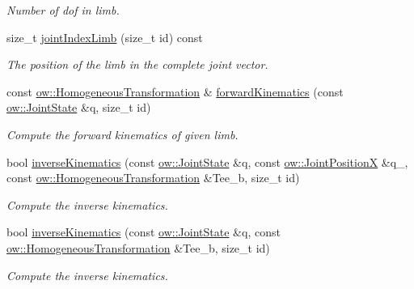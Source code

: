 \begin{DoxyCompactItemize}
\begin{DoxyCompactList}\small\item\em Number of dof in limb. \end{DoxyCompactList}\item 
size\+\_\+t \hyperlink{classow__ik_1_1RobotModel_a04b2562aa26285f75928401e99cf87a5}{joint\+Index\+Limb} (size\+\_\+t id) const \hypertarget{classow__ik_1_1RobotModel_a04b2562aa26285f75928401e99cf87a5}{}\label{classow__ik_1_1RobotModel_a04b2562aa26285f75928401e99cf87a5}

\begin{DoxyCompactList}\small\item\em The position of the limb in the complete joint vector. \end{DoxyCompactList}\item 
const \hyperlink{classow__core_1_1HomogeneousTransformation}{ow\+::\+Homogeneous\+Transformation} \& \hyperlink{classow__ik_1_1RobotModel_a18005734119feae026166257a5cc33a6}{forward\+Kinematics} (const \hyperlink{classow__core_1_1JointState}{ow\+::\+Joint\+State} \&q, size\+\_\+t id)
\begin{DoxyCompactList}\small\item\em Compute the forward kinematics of given limb. \end{DoxyCompactList}\item 
bool \hyperlink{classow__ik_1_1RobotModel_a8534243036b7e9a204a6bae710211046}{inverse\+Kinematics} (const \hyperlink{classow__core_1_1JointState}{ow\+::\+Joint\+State} \&q, const \hyperlink{classow__core_1_1JointPosition}{ow\+::\+Joint\+PositionX} \&q\+\_, const \hyperlink{classow__core_1_1HomogeneousTransformation}{ow\+::\+Homogeneous\+Transformation} \&Tee\+\_\+b, size\+\_\+t id)
\begin{DoxyCompactList}\small\item\em Compute the inverse kinematics. \end{DoxyCompactList}\item 
bool \hyperlink{classow__ik_1_1RobotModel_a07eaff85fc95f35b32e6ccec314ab0a7}{inverse\+Kinematics} (const \hyperlink{classow__core_1_1JointState}{ow\+::\+Joint\+State} \&q, const \hyperlink{classow__core_1_1HomogeneousTransformation}{ow\+::\+Homogeneous\+Transformation} \&Tee\+\_\+b, size\+\_\+t id)
\begin{DoxyCompactList}\small\item\em Compute the inverse kinematics. \end{DoxyCompactList}\item 

\end{DoxyCompactItemize}
